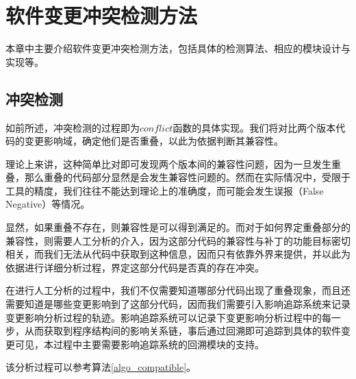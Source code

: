 \chapter{软件变更冲突检测方法}
\label {chap_conflict}

本章中主要介绍软件变更冲突检测方法，包括具体的检测算法、相应的模块设计与实现等。

\section{冲突检测}
\label {chap_conflict}

如前所述，冲突检测的过程即为$conflict$函数的具体实现。我们将对比两个版本代码的变更影响域，确定他们是否重叠，以此为依据判断其兼容性。

%

理论上来讲，这种简单比对即可发现两个版本间的兼容性问题，因为一旦发生重叠，那么重叠的代码部分显然是会发生兼容性问题的。然而在实际情况中，受限于工具的精度，我们往往不能达到理论上的准确度，而可能会发生误报（False Negative）等情况。

显然，如果重叠不存在，则兼容性是可以得到满足的。而对于如何界定重叠部分的兼容性，则需要人工分析的介入，因为这部分代码的兼容性与补丁的功能目标密切相关，而我们无法从代码中获取到这种信息，因而只有依靠外界来提供，并以此为依据进行详细分析过程，界定这部分代码是否真的存在冲突。

在进行人工分析的过程中，我们不仅需要知道哪部分代码出现了重叠现象，而且还需要知道是哪些变更影响到了这部分代码，因而我们需要引入影响追踪系统来记录变更影响分析过程的轨迹。影响追踪系统可以记录下变更影响分析过程中的每一步，从而获取到程序结构间的影响关系链，事后通过回溯即可追踪到具体的软件变更可见，本过程中主要需要影响追踪系统的回溯模块的支持。


该分析过程可以参考算法\ref {algo_compatible}。

